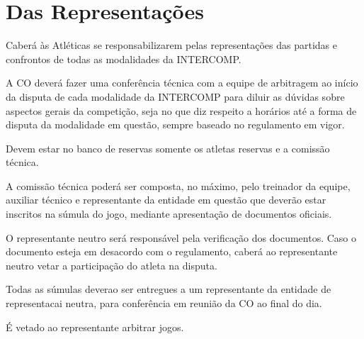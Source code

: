 {\let\clearpage\relax \chapter{Das Representações}}

\begin{article}
	Caberá às Atléticas se responsabilizarem pelas representações das partidas e confrontos de todas as modalidades da INTERCOMP.
\end{article}

\begin{article}
	A CO deverá fazer uma conferência técnica com a equipe de arbitragem ao início da disputa de cada modalidade da INTERCOMP para diluir as dúvidas sobre aspectos gerais da competição, seja no que diz respeito a horários até a forma de disputa da modalidade em questão, sempre baseado no regulamento em vigor.

	\begin{xparagraph}
		Devem estar no banco de reservas somente os atletas reservas e a comissão técnica.
	\end{xparagraph}

	\begin{xparagraph}
		A comissão técnica poderá ser composta, no máximo, pelo treinador da equipe, auxiliar técnico e representante da entidade em questão que deverão estar inscritos na súmula do jogo, mediante apresentação de documentos oficiais.
	\end{xparagraph}

	\begin{xparagraph}
		O representante neutro será responsável pela verificação dos documentos. Caso o documento esteja em desacordo com o regulamento, caberá ao representante neutro vetar a participação do atleta na disputa.
	\end{xparagraph}

	\begin{xparagraph}
		Todas as súmulas deverao ser entregues a um representante da entidade de representacai neutra, para conferência em reunião da CO ao final do dia.
	\end{xparagraph}
\end{article}

\begin{article}
	É vetado ao representante arbitrar jogos.
\end{article}
